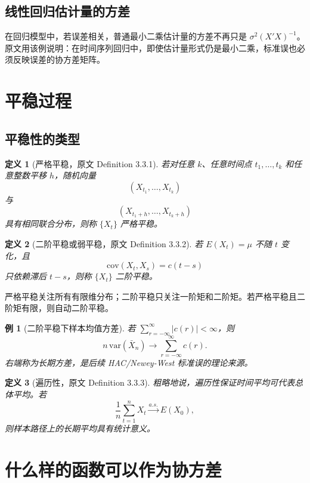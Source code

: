 \documentclass[11pt,a4paper]{ctexart}
\newtheorem{definition}{定义}[section]
\newtheorem{example}{例}[section]
\begin{document}
\subsection{线性回归估计量的方差}

在回归模型中，若误差相关，普通最小二乘估计量的方差不再只是 \(\sigma^2(X'X)^{-1}\)。原文用该例说明：在时间序列回归中，即使估计量形式仍是最小二乘，标准误也必须反映误差的协方差矩阵。

\section{平稳过程}

\subsection{平稳性的类型}

\begin{definition}[严格平稳，原文 Definition 3.3.1]
若对任意 \(k\)、任意时间点 \(t_1,\ldots,t_k\) 和任意整数平移 \(h\)，随机向量
\[
  (X_{t_1},\ldots,X_{t_k})
\]
与
\[
  (X_{t_1+h},\ldots,X_{t_k+h})
\]
具有相同联合分布，则称 \(\{X_t\}\) 严格平稳。
\end{definition}

\begin{definition}[二阶平稳或弱平稳，原文 Definition 3.3.2]
若 \(E(X_t)=\mu\) 不随 \(t\) 变化，且
\[
  \mathrm{cov}(X_t,X_s)=c(t-s)
\]
只依赖滞后 \(t-s\)，则称 \(\{X_t\}\) 二阶平稳。
\end{definition}

严格平稳关注所有有限维分布；二阶平稳只关注一阶矩和二阶矩。若严格平稳且二阶矩有限，则自动二阶平稳。

\begin{example}[二阶平稳下样本均值方差]
若 \(\sum_{r=-\infty}^{\infty}|c(r)|<\infty\)，则
\[
  n\,\mathrm{var}(\bar X_n)
  \to \sum_{r=-\infty}^{\infty}c(r).
\]
右端称为长期方差，是后续 HAC/Newey-West 标准误的理论来源。
\end{example}

\begin{definition}[遍历性，原文 Definition 3.3.3]
粗略地说，遍历性保证时间平均可代表总体平均。若
\[
  \frac1n\sum_{t=1}^n X_t \xrightarrow{a.s.} E(X_0),
\]
则样本路径上的长期平均具有统计意义。
\end{definition}

\section{什么样的函数可以作为协方差}
\end{document}
